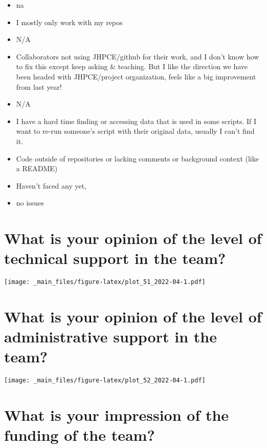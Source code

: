 \documentclass[
]{book}
\providecommand{\tightlist}{%
  \setlength{\itemsep}{0pt}\setlength{\parskip}{0pt}}
\begin{document}
\begin{itemize}
\tightlist
\item
  na
\item
  I mostly only work with my repos
\item
  N/A
\item
  Collaborators not using JHPCE/github for their work, and I don't know how to fix this except keep asking \& teaching. But I like the direction we have been headed with JHPCE/project organization, feels like a big improvement from last year!
\item
  N/A
\item
  I have a hard time finding or accessing data that is used in some scripts. If I want to re-run someone's script with their original data, usually I can't find it.
\item
  Code outside of repositories or lacking comments or background context (like a README)
\item
  Haven't faced any yet,
\item
  no issues
\end{itemize}

\hypertarget{what-is-your-opinion-of-the-level-of-technical-support-in-the-team}{%
\section{What is your opinion of the level of technical support in the team?}\label{what-is-your-opinion-of-the-level-of-technical-support-in-the-team}}

\texttt{[image: \_main\_files/figure-latex/plot\_51\_2022-04-1.pdf]}

\hypertarget{what-is-your-opinion-of-the-level-of-administrative-support-in-the-team}{%
\section{What is your opinion of the level of administrative support in the team?}\label{what-is-your-opinion-of-the-level-of-administrative-support-in-the-team}}

\texttt{[image: \_main\_files/figure-latex/plot\_52\_2022-04-1.pdf]}

\hypertarget{what-is-your-impression-of-the-funding-of-the-team}{%
\section{What is your impression of the funding of the team?}\label{what-is-your-impression-of-the-funding-of-the-team}}
\end{document}
